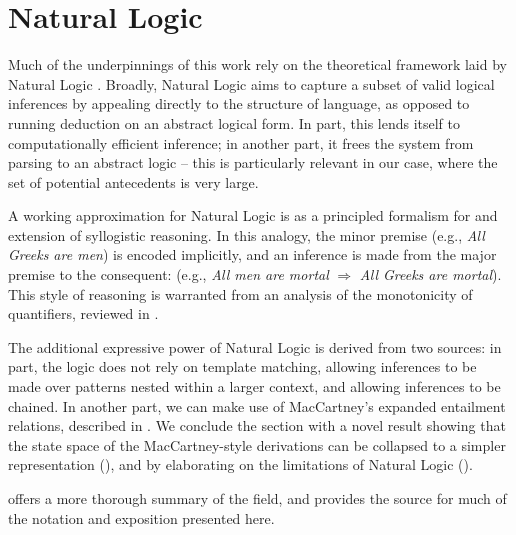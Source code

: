 \chapter{Natural Logic}

Much of the underpinnings of this work rely on the theoretical framework
  laid by Natural Logic
  \cite{key:1986benthem-natlog,key:1991valencia-natlog}.
Broadly, Natural Logic aims to capture a subset of valid logical
  inferences by appealing directly to the structure of language,
  as opposed to running deduction on an abstract logical form.
In part, this lends itself to computationally efficient inference;
  in another part, it frees the system from parsing to an abstract
  logic -- this is particularly relevant in our case, where the set
  of potential antecedents is very large.

A working approximation for Natural Logic is as a principled formalism
  for and extension of syllogistic reasoning.
In this analogy, the minor premise
  (e.g., \textit{All Greeks are men}) is encoded implicitly,
  and an inference is made from the major premise to the consequent:
  (e.g., \textit{All men are mortal} $\Rightarrow$ \textit{All Greeks are mortal}).
This style of reasoning is warranted from an analysis of the monotonicity
  of quantifiers, reviewed in .

The additional expressive power of Natural Logic is derived from two
  sources: in part, the logic does not rely on template matching,
  allowing inferences to be made over patterns nested within a larger
  context, and allowing inferences to be chained.
In another part, we can make use of MacCartney's expanded entailment
  relations, described in .
We conclude the section with a novel result showing that the state
  space of the MacCartney-style derivations can be collapsed to a
  simpler representation (), and by
  elaborating on the limitations of Natural Logic ().

 offers a more thorough summary of the
  field, and provides the source for much of the notation and
  exposition presented here.

